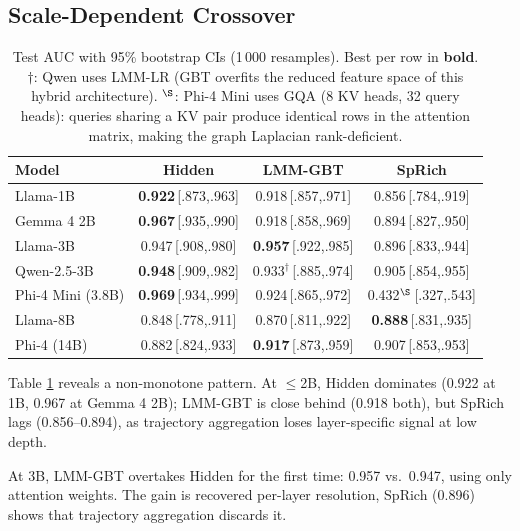 \documentclass{article}
\begin{document}
\subsection{Scale-Dependent Crossover}

\begin{table}[t]
\centering
\setlength{\tabcolsep}{1pt}
\caption{Test AUC with 95\% bootstrap CIs (1\,000 resamples).  Best per
  row in \textbf{bold}.  $\dagger$: Qwen uses LMM-LR (GBT overfits the
  reduced feature space of this hybrid architecture).
  $^\S$: Phi-4 Mini uses GQA (8 KV heads, 32 query heads): queries
  sharing a KV pair produce identical rows in the attention matrix,
  making the graph Laplacian rank-deficient. }
\label{tab:results}
\footnotesize
\begin{tabular}{lccc}
\toprule
Model & Hidden & LMM-GBT & SpRich \\
\midrule
Llama-1B          & \textbf{0.922}\,\tiny{[.873,.963]} & 0.918\,\tiny{[.857,.971]} & 0.856\,\tiny{[.784,.919]} \\
Gemma 4 2B        & \textbf{0.967}\,\tiny{[.935,.990]} & 0.918\,\tiny{[.858,.969]} & 0.894\,\tiny{[.827,.950]} \\
Llama-3B          & 0.947\,\tiny{[.908,.980]} & \textbf{0.957}\,\tiny{[.922,.985]} & 0.896\,\tiny{[.833,.944]} \\
Qwen-2.5-3B      & \textbf{0.948}\,\tiny{[.909,.982]} & 0.933$^\dagger$\,\tiny{[.885,.974]} & 0.905\,\tiny{[.854,.955]} \\
Phi-4 Mini (3.8B) & \textbf{0.969}\,\tiny{[.934,.999]} & 0.924\,\tiny{[.865,.972]} & 0.432$^\S$\,\tiny{[.327,.543]} \\
Llama-8B          & 0.848\,\tiny{[.778,.911]} & 0.870\,\tiny{[.811,.922]} & \textbf{0.888}\,\tiny{[.831,.935]} \\
Phi-4 (14B)       & 0.882\,\tiny{[.824,.933]} & \textbf{0.917}\,\tiny{[.873,.959]} & 0.907\,\tiny{[.853,.953]} \\
\bottomrule
\end{tabular}
\end{table}

Table \ref{tab:results} reveals a non-monotone pattern.  At
${\leq}$2B, Hidden dominates (0.922 at 1B, 0.967 at Gemma 4 2B);
LMM-GBT is close behind (0.918 both), but SpRich lags (0.856--0.894),
as trajectory aggregation loses layer-specific signal at low depth.

At 3B, LMM-GBT overtakes Hidden for the first time: 0.957 vs.\ 0.947,
using only attention weights.  The gain is recovered per-layer
resolution, SpRich (0.896) shows that trajectory aggregation
discards it.
\end{document}
